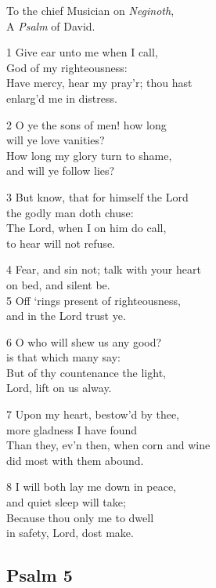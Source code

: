 \begin{multicols}{3}
To the chief Musician on \emph{Neginoth},\\
A \emph{Psalm} of David.

1 Give ear unto me when I call,\\
God of my righteousness:\\
Have mercy, hear my pray’r; thou hast\\
enlarg’d me in distress.

2 O ye the sons of men! how long\\
will ye love vanities?\\
How long my glory turn to shame,\\
and will ye follow lies?

3 But know, that for himself the Lord\\
the godly man doth chuse:\\
The Lord, when I on him do call,\\
to hear will not refuse.

4 Fear, and sin not; talk with your heart\\
on bed, and silent be.\\
5 Off ‘rings present of righteousness,\\
and in the Lord trust ye.

6 O who will shew us any good?\\
is that which many say:\\
But of thy countenance the light,\\
Lord, lift on us alway.

7 Upon my heart, bestow’d by thee,\\
more gladness I have found\\
Than they, ev’n then, when corn and wine\\
did most with them abound.

8 I will both lay me down in peace,\\
and quiet sleep will take;\\
Because thou only me to dwell\\
in safety, Lord, dost make.

\begin{center}
\quad{}\quad{}
\end{center}


\subsection*{Psalm 5}


\end{multicols}
